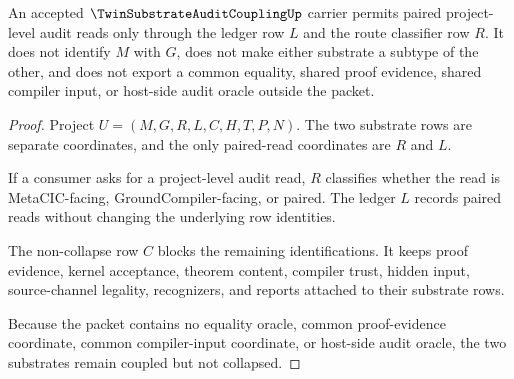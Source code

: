 \begin{theorem}
\label{thm:twin-substrate-audit-coupling-noncollapse}
An accepted $\TwinSubstrateAuditCouplingUp$ carrier permits paired project-level audit reads only through the ledger row $L$ and the route classifier row $R$. It does not identify $M$ with $G$, does not make either substrate a subtype of the other, and does not export a common equality, shared proof evidence, shared compiler input, or host-side audit oracle outside the packet.
\end{theorem}
\begin{proof}
Project $U=(M,G,R,L,C,H,T,P,N)$. The two substrate rows are separate coordinates, and the only paired-read coordinates are $R$ and $L$.

If a consumer asks for a project-level audit read, $R$ classifies whether the read is MetaCIC-facing, GroundCompiler-facing, or paired. The ledger $L$ records paired reads without changing the underlying row identities.

The non-collapse row $C$ blocks the remaining identifications. It keeps proof evidence, kernel acceptance, theorem content, compiler trust, hidden input, source-channel legality, recognizers, and reports attached to their substrate rows.

Because the packet contains no equality oracle, common proof-evidence coordinate, common compiler-input coordinate, or host-side audit oracle, the two substrates remain coupled but not collapsed.
\end{proof}

